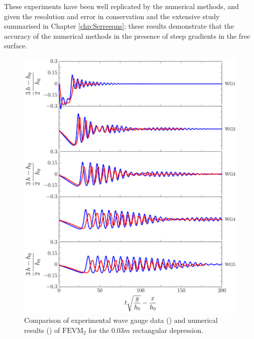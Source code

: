 These experiments have been well replicated by the numerical methods, and given the resolution and error in conservation and the extensive study summarised in Chapter \ref{chp:Serreeqns}; these results demonstrate that the accuracy of the numerical methods in the presence of steep gradients in the free surface.      
\begin{figure}
	\centering
	\includegraphics[width=\textwidth]{./chp6/figures/Experiment/Segur/LongWGsFEVM3cm.pdf}
	\caption{Comparison of experimental wave gauge data ({\color{red}\solidrule}) and numerical results ({\color{blue}\solidrule}) of $\text{FEVM}_2$ for the $0.03m$ rectangular depression.}
	\label{fig:Segur3cmFEVM}
\end{figure}
